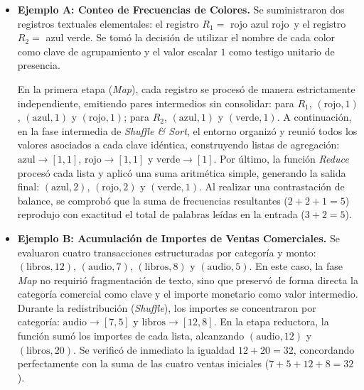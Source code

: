 \documentclass[12pt,a4paper]{article}
\begin{document}
\begin{itemize}
    \item \textbf{Ejemplo A: Conteo de Frecuencias de Colores.} Se suministraron dos registros textuales elementales: el registro $R_1 =$ \guillemotleft rojo azul rojo\guillemotright\ y el registro $R_2 =$ \guillemotleft azul verde\guillemotright. Se tomó la decisión de utilizar el nombre de cada color como clave de agrupamiento y el valor escalar $1$ como testigo unitario de presencia.
    
    En la primera etapa (\textit{Map}), cada registro se procesó de manera estrictamente independiente, emitiendo pares intermedios sin consolidar: para $R_1$, $(\text{rojo}, 1)$, $(\text{azul}, 1)$ y $(\text{rojo}, 1)$; para $R_2$, $(\text{azul}, 1)$ y $(\text{verde}, 1)$. A continuación, en la fase intermedia de \textit{Shuffle \& Sort}, el entorno organizó y reunió todos los valores asociados a cada clave idéntica, construyendo listas de agregación: $\text{azul} \rightarrow [1, 1]$, $\text{rojo} \rightarrow [1, 1]$ y $\text{verde} \rightarrow [1]$. Por último, la función \textit{Reduce} procesó cada lista y aplicó una suma aritmética simple, generando la salida final: $(\text{azul}, 2)$, $(\text{rojo}, 2)$ y $(\text{verde}, 1)$. Al realizar una contrastación de balance, se comprobó que la suma de frecuencias resultantes ($2 + 2 + 1 = 5$) reprodujo con exactitud el total de palabras leídas en la entrada ($3 + 2 = 5$).
    
    \item \textbf{Ejemplo B: Acumulación de Importes de Ventas Comerciales.} Se evaluaron cuatro transacciones estructuradas por categoría y monto: $(\text{libros}, 12)$, $(\text{audio}, 7)$, $(\text{libros}, 8)$ y $(\text{audio}, 5)$. En este caso, la fase \textit{Map} no requirió fragmentación de texto, sino que preservó de forma directa la categoría comercial como clave y el importe monetario como valor intermedio. Durante la redistribución (\textit{Shuffle}), los importes se concentraron por categoría: $\text{audio} \rightarrow [7, 5]$ y $\text{libros} \rightarrow [12, 8]$. En la etapa reductora, la función sumó los importes de cada lista, alcanzando $(\text{audio}, 12)$ y $(\text{libros}, 20)$. Se verificó de inmediato la igualdad $12 + 20 = 32$, concordando perfectamente con la suma de las cuatro ventas iniciales ($7 + 5 + 12 + 8 = 32$).
\end{itemize}
\end{document}
